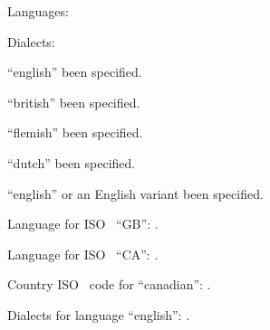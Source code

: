 \documentclass[british,francais,american,canadian,canadien,dutch,a4paper]{article}
\begin{document}
Languages:

Dialects: 

``english''  been specified.

``british''  been specified.

``flemish''  been specified.

``dutch''  been specified.

``english'' or an English variant 
 been specified.

Language for ISO \TwoLetterIsoCountryCode\ ``GB'': 
.

Language for ISO \TwoLetterIsoCountryCode\ ``CA'': 
.

Country ISO \TwoLetterIsoCountryCode\ code for ``canadian'':
.

Dialects for language ``english'':
.
\end{document}
